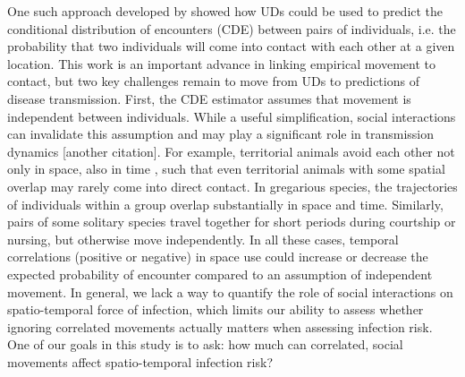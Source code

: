 \documentclass[letterpaper]{article}
\begin{document}

One such approach developed by \citet{Noonan2021} showed how UDs could be used to predict the conditional distribution of encounters (CDE) between pairs of individuals, i.e. the probability that two individuals will come into contact with each other at a given location.
This work is an important advance in linking empirical movement to contact, but two key challenges remain to move from UDs to predictions of disease transmission.  
First, the CDE estimator assumes that movement is independent between individuals.
While a useful simplification, social interactions can invalidate this assumption and may play a significant role in transmission dynamics \citep{Manlove2018} [another citation]. For example, territorial animals avoid each other not only in space, also in time \citep{Giuggioli2013}, such that even territorial animals with some spatial overlap may rarely come into direct contact.  In gregarious species, the trajectories of individuals within a group overlap substantially in space and time. Similarly, pairs of some solitary species travel together for short periods during courtship or nursing, but otherwise move independently. In all these cases, temporal correlations (positive or negative) in space use could increase or decrease the expected probability of encounter compared to an assumption of independent movement. In general, we lack a way to quantify the role of social interactions on spatio-temporal force of infection, which limits our ability to assess whether ignoring correlated movements actually matters when assessing infection risk. One of our goals in this study is to ask: how much can correlated, social movements affect spatio-temporal infection risk?

\end{document}
